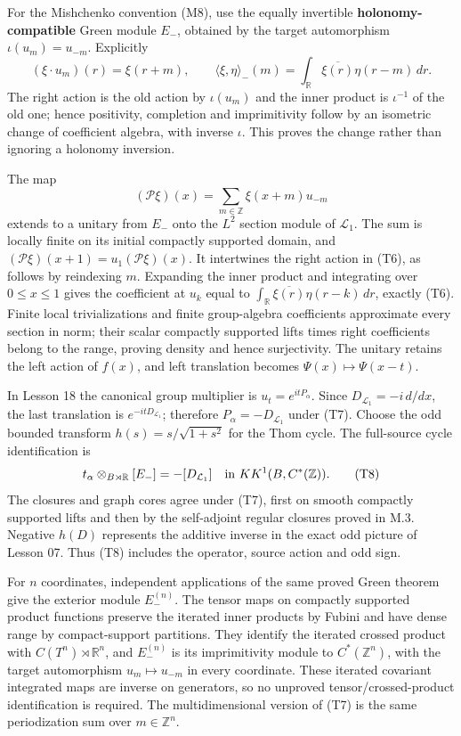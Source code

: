 \documentclass[
  11pt,
]{article}
\begin{document}
For the Mishchenko convention (M8), use the equally invertible
\textbf{holonomy-compatible} Green module \(E_-\), obtained by the
target automorphism \(\iota(u_m)=u_{-m}\). Explicitly \[
 (\xi\cdot u_m)(r)=\xi(r+m),\qquad
 \langle\xi,\eta\rangle_-(m)
       =\int_{\mathbb R}\overline{\xi(r)}\eta(r-m)\,dr.
 \tag{T6}
\] The right action is the old action by \(\iota(u_m)\) and the inner
product is \(\iota^{-1}\) of the old one; hence positivity, completion
and imprimitivity follow by an isometric change of coefficient algebra,
with inverse \(\iota\). This proves the change rather than ignoring a
holonomy inversion.

The map \[
 (\mathcal P\xi)(x)=\sum_{m\in\mathbb Z}\xi(x+m)u_{-m}
 \tag{T7}
\] extends to a unitary from \(E_-\) onto the \(L^2\) section module of
\(\mathcal L_1\). The sum is locally finite on its initial compactly
supported domain, and \((\mathcal P\xi)(x+1)=u_1(\mathcal P\xi)(x)\). It
intertwines the right action in (T6), as follows by reindexing \(m\).
Expanding the inner product and integrating over \(0\leq x\leq1\) gives
the coefficient at \(u_k\) equal to
\(\int_{\mathbb R}\overline{\xi(r)}\eta(r-k)\,dr\), exactly (T6). Finite
local trivializations and finite group-algebra coefficients approximate
every section in norm; their scalar compactly supported lifts times
right coefficients belong to the range, proving density and hence
surjectivity. The unitary retains the left action of \(f(x)\), and left
translation becomes \(\Psi(x)\mapsto\Psi(x-t)\).

In Lesson 18 the canonical group multiplier is \(u_t=e^{itP_\alpha}\).
Since \(D_{\mathcal L_1}=-i\,d/dx\), the last translation is
\(e^{-itD_{\mathcal L_1}}\); therefore \(P_\alpha=-D_{\mathcal L_1}\)
under (T7). Choose the odd bounded transform \(h(s)=s/\sqrt{1+s^2}\) for
the Thom cycle. The full-source cycle identification is \[
 t_\alpha\otimes_{B\rtimes\mathbb R}[E_-]
       =-[D_{\mathcal L_1}]\quad\hbox{in }KK^1(B,C^*(\mathbb Z)).
 \tag{T8}
\] The closures and graph cores agree under (T7), first on smooth
compactly supported lifts and then by the self-adjoint regular closures
proved in M.3. Negative \(h(D)\) represents the additive inverse in the
exact odd picture of Lesson 07. Thus (T8) includes the operator, source
action and odd sign.

For \(n\) coordinates, independent applications of the same proved Green
theorem give the exterior module \(E_-^{(n)}\). The tensor maps on
compactly supported product functions preserve the iterated inner
products by Fubini and have dense range by compact-support partitions.
They identify the iterated crossed product with
\(C(T^n)\rtimes\mathbb R^n\), and \(E_-^{(n)}\) is its imprimitivity
module to \(C^*(\mathbb Z^n)\), with the target automorphism
\(u_m\mapsto u_{-m}\) in every coordinate. These iterated covariant
integrated maps are inverse on generators, so no unproved
tensor/crossed-product identification is required. The multidimensional
version of (T7) is the same periodization sum over \(m\in\mathbb Z^n\).
\end{document}

